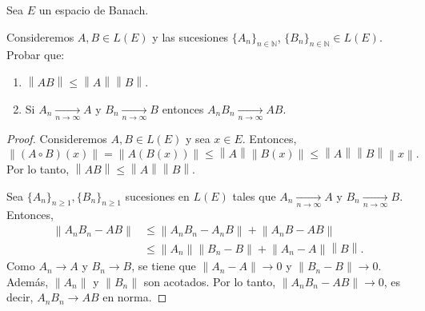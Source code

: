 \documentclass{article}
\theoremstyle{definition}
\newcommand{\N}{\mathbb{N}}
\newcommand{\norm}[1]{\left\lVert #1 \right\rVert}       %
\newenvironment{ejercicio}[1]{\begin{trivlist}
\item[\hskip \labelsep {\bfseries Ejercicio}\hskip \labelsep {\bfseries #1.}]}{\end{trivlist}}
\begin{document}
\begin{ejercicio}{12}
    Sea \(E\) un espacio de Banach.

    Consideremos \(A,B\in L(E)\) y las sucesiones \( {\{A_n\}}_{n\in\N}\), \( {\{B_n\}}_{n\in\N}\in L(E) \). Probar que:
    \begin{enumerate}
        \item \(\norm{AB}\leq\norm{A}\norm{B}\).
        \item Si \( A_n\xrightarrow[n\to\infty]{} A \) y \( B_n\xrightarrow[n\to\infty]{} B \) entonces \( A_n B_n\xrightarrow[n\to\infty]{} AB \).
    \end{enumerate}
\end{ejercicio}
\begin{proof}
    Consideremos \( A, B \in L(E) \) y sea \( x \in E \). Entonces, \[
        \norm{(A \circ B)(x)} = \norm{A(B(x))} \le \norm{A} \norm{B(x)} \le \norm{A} \norm{B} \norm{x}.
    \]
    Por lo tanto, \( \norm{AB} \le \norm{A}\norm{B} \).

    Sea \( { \{ A_n \} }_{n \ge 1}, { \{ B_n \} }_{n \ge 1} \) sucesiones en \( L(E) \) tales que \( A_n \xrightarrow[n\to\infty]{} A \) y \( B_n \xrightarrow[n\to\infty]{} B \). Entonces, \begin{align*}
        \norm{A_n B_n - AB} & \le \norm{A_n B_n - A_n B} + \norm{A_n B - AB}           \\
                            & \le \norm{A_n} \norm{B_n - B} + \norm{A_n - A} \norm{B}.
    \end{align*}
    Como \( A_n \to A \) y \( B_n \to B \), se tiene que \( \norm{A_n - A} \to 0 \) y \( \norm{B_n - B} \to 0 \). Además, \( \norm{A_n} \) y \( \norm{B_n} \) son acotados. Por lo tanto, \( \norm{A_n B_n - AB} \to 0 \), es decir, \( A_n B_n \to AB \) en norma.
\end{proof}

\vspace{0.5cm}
\end{document}
